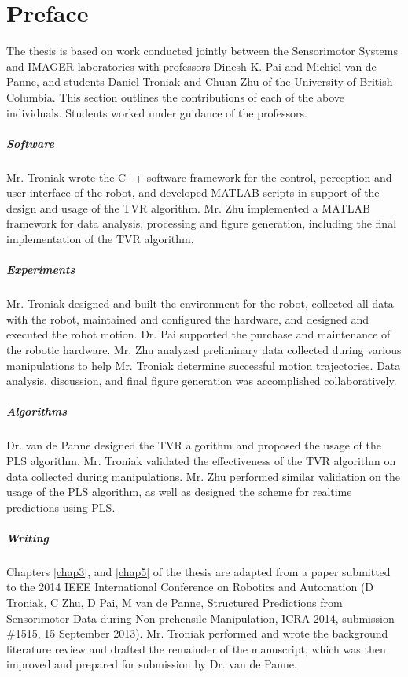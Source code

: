 \chapter{Preface} %
The thesis is based on work conducted jointly between the Sensorimotor Systems and IMAGER laboratories with professors Dinesh K. Pai and Michiel van de Panne, and students Daniel Troniak and Chuan Zhu of the University of British Columbia. This section outlines the contributions of each of the above individuals. Students worked under guidance of the professors.  

\paragraph{Software}
Mr. Troniak wrote the C++ software framework for the control, perception and user interface of the robot, and developed MATLAB scripts in support of the design and usage of the TVR algorithm. Mr. Zhu implemented a MATLAB framework for data analysis, processing and figure generation, including the final implementation of the TVR algorithm. 

\paragraph{Experiments} 
Mr. Troniak designed and built the environment for the robot, collected all data with the robot, maintained and configured the hardware, and designed and executed the robot motion. Dr. Pai supported the purchase and maintenance of the robotic hardware. Mr. Zhu analyzed preliminary data collected during various manipulations to help Mr. Troniak determine successful motion trajectories. Data analysis, discussion, and final figure generation was accomplished collaboratively.

\paragraph{Algorithms}
Dr. van de Panne designed the TVR algorithm and proposed the usage of the PLS algorithm. Mr. Troniak validated the effectiveness of the TVR algorithm on data collected during manipulations. Mr. Zhu performed similar validation on the usage of the PLS algorithm, as well as designed the scheme for realtime predictions using PLS.

\paragraph{Writing}
Chapters \ref{chap3}, and \ref{chap5} of the thesis are adapted from a paper submitted to the 2014 IEEE International Conference on Robotics and Automation (D Troniak, C Zhu, D Pai, M van de Panne, Structured Predictions from Sensorimotor Data during Non-prehensile Manipulation, ICRA 2014, submission \#1515, 15 September 2013). Mr. Troniak performed and wrote the background literature review and drafted the remainder of the manuscript, which was then improved and prepared for submission by Dr. van de Panne.

